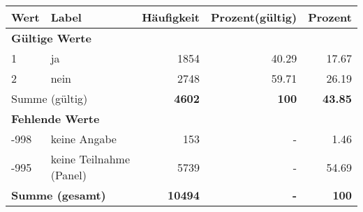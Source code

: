      \begin{longtable}{lXrrr}
     \toprule
     \textbf{Wert} & \textbf{Label} & \textbf{Häufigkeit} & \textbf{Prozent(gültig)} & \textbf{Prozent} \\
     \endhead
     \midrule
     \multicolumn{5}{l}{\textbf{Gültige Werte}}\\

     1 &
     \multicolumn{1}{X}{ ja   } &


       \num{1854} &
       \num[round-mode=places,round-precision=2]{40.29} &
         \num[round-mode=places,round-precision=2]{17.67} \\

     2 &
     \multicolumn{1}{X}{ nein   } &


       \num{2748} &
       \num[round-mode=places,round-precision=2]{59.71} &
         \num[round-mode=places,round-precision=2]{26.19} \\
     \midrule
     \multicolumn{2}{l}{Summe (gültig)} &
       \textbf{\num{4602}} &
     \textbf{\num{100}} &
       \textbf{\num[round-mode=places,round-precision=2]{43.85}} \\
     \multicolumn{5}{l}{\textbf{Fehlende Werte}}\\
       -998 &
       keine Angabe &
         \num{153} &
        - &
         \num[round-mode=places,round-precision=2]{1.46} \\
       -995 &
       keine Teilnahme (Panel) &
         \num{5739} &
        - &
         \num[round-mode=places,round-precision=2]{54.69} \\
     \midrule
     \multicolumn{2}{l}{\textbf{Summe (gesamt)}} &
          \textbf{\num{10494}} &
        \textbf{-} &
        \textbf{\num{100}} \\
     \bottomrule
     \end{longtable}
     
